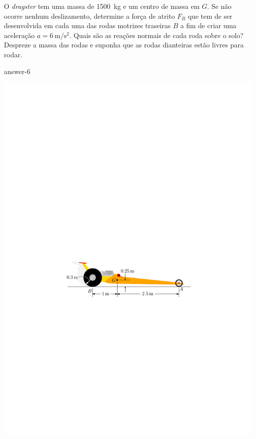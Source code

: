 \item O \textit{dragster} tem uma massa de \SI{1500}{\kilogram} e um centro de massa em $G$. Se não ocorre nenhum deslizamento, determine a força de atrito $F_{B}$ que tem de ser desenvolvida em cada uma das rodas motrizes traseiras $B$ a fim de criar uma aceleração $a=\SI{6}{\meter/\second^{2}}$. Quais são as reações normais de cada roda sobre o solo? Despreze a massa das rodas e suponha que as rodas dianteiras estão livres para rodar.

\begin{flushright}
	{answer-6}
\end{flushright}

\vspace{-2.4cm}
\begin{flushleft}
	\includegraphics[scale=1]{../../images/draw_5}
\end{flushleft}